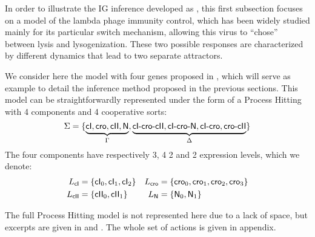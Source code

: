 

\newcommand{\cI}{\f{cI}}
\newcommand{\cro}{\f{cro}}
\newcommand{\cII}{\f{cII}}
\newcommand{\N}{\f{N}}

\newcommand{\tcIcrocII}{cI\mbox{-}cro\mbox{-}cII}
\newcommand{\tcIcroN}{cI\mbox{-}cro\mbox{-}N}
\newcommand{\tcIcro}{cI\mbox{-}cro}
\newcommand{\cIcrocII}{\f{\tcIcrocII}}
\newcommand{\cIcroN}{\f{\tcIcroN}}
\newcommand{\cIcro}{\f{\tcIcro}}

\newcommand{\tcrocII}{cro\mbox{-}cII}
\newcommand{\crocII}{\f{\tcrocII}}

In order to illustrate the IG inference developed as ,
this first subsection focuses on a model of the lambda phage immunity control,
which has been widely studied mainly for its particular switch mechanism,
allowing this virus to “chose” between lysis and lysogenization.
These two possible responses are characterized by different dynamics that lead to two
separate attractors.

We consider here the model with four genes proposed in \cite{thieffry_dynamical_1995},
which will serve as example to detail the inference method proposed in the previous sections.
This model can be straightforwardly represented under the form of a Process Hitting
with 4 components %
and 4 cooperative sorts: %
\[\PHs = \{ \underbrace{\cI, \cro, \cII, \N}_{\Gamma},
  \underbrace{\cIcrocII, \cIcroN, \cIcro, \crocII}_{\Delta} \}\]
The four components have respectively 3, 4 2 and 2 expression levels,
which we denote:
\begin{align*}
  \PHl_{\cI} &= \{ \cI_0, \cI_1, \cI_2 \} &
  \PHl_{\cro} &= \{ \cro_0, \cro_1, \cro_2, \cro_3 \} \\
  \PHl_{\cII} &= \{ \cII_0, \cII_1 \} &
  \PHl_{\N} &= \{ \N_0, \N_1 \} \\
\end{align*}

The full Process Hitting model is not represented here due to a lack of space,
but excerpts are given in  and .
The whole set of actions is given in appendix.



